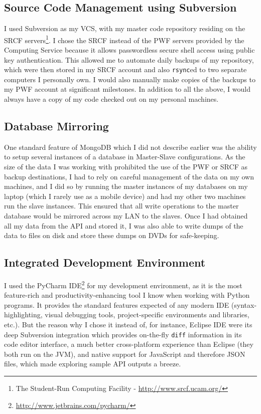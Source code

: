 \documentclass[a4paper,12pt,twoside,notitlepage]{report}
\begin{document}
\subsection{Source Code Management using Subversion} 

I used Subversion as my VCS, with my master code repository residing on the SRCF
servers\footnote{The Student-Run Computing Facility -
\url{http://www.srcf.ucam.org/}}. I chose the SRCF instead of the PWF servers
provided by the Computing Service because it allows passwordless secure
shell access using public key authentication. This allowed me to automate daily
backups of my repository, which were then stored in my SRCF account and also
\texttt{rsync}ed to two separate computers I personally own. I would also
manually make copies of the backups to my PWF account at significant
milestones. In addition to all the above, I would always have a copy of my code
checked out on my personal machines.

\subsection{Database Mirroring}

One standard feature of MongoDB which I did not describe earlier was the ability
to setup several instances of a database in Master-Slave configurations. As the
size of the data I was working with prohibited the use of the PWF or SRCF as
backup destinations, I had to rely on careful management of the data on my own
machines, and I did so by running the master instances of my databases on my
laptop (which I rarely use as a mobile device) and had my other two machines run
the slave instances. This ensured that all write operations to the master
database would be mirrored across my LAN to the slaves. Once I had obtained all
my data from the API and stored it, I was also able to write dumps of the data
to files on disk and store these dumps on DVDs for safe-keeping.

\subsection{Integrated Development Environment}

I used the PyCharm IDE\footnote{\url{http://www.jetbrains.com/pycharm/}} for my
development environment, as it is the most feature-rich and
productivity-enhancing tool I know when working with Python programs. It
provides the standard features expected of any modern IDE (syntax-highlighting,
visual debugging tools, project-specific environments and libraries, etc.). But
the reason why I chose it instead of, for instance, Eclipse IDE were its deep
Subversion integration which provides on-the-fly \texttt{diff} information in
its code editor interface, a much better cross-platform experience than Eclipse
(they both run on the JVM), and native support for JavaScript and therefore JSON
files, which made exploring sample API outputs a breeze. 
\end{document}
